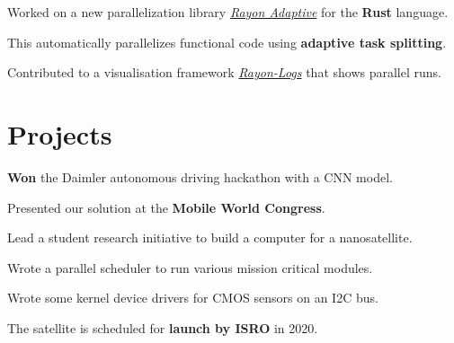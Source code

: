 \documentclass[]{smresume}
\begin{document}
\begin{minipage}[t]{0.66\textwidth}
\begin{tightemize}
\item Worked on a new parallelization library \emph{\href{http://datamove.imag.fr/frederic.wagner/rayon-adaptive.html}{Rayon Adaptive}} for the \textbf{Rust} language.
\item This automatically parallelizes functional code using \textbf{adaptive task splitting}. 
\item Contributed to a visualisation framework \emph{\href{http://datamove.imag.fr/frederic.wagner/rayon-logs.html}{Rayon-Logs}} that shows parallel runs.
\end{tightemize}
\subsectionsep


% 

\section{Projects}
\begin{tightemize}
\item \textbf{Won} the Daimler autonomous driving hackathon with a CNN model. 
\item Presented our solution at the \textbf{Mobile World Congress}.
\end{tightemize}

\begin{tightemize}
    \item Lead a student research initiative to build a computer for a nanosatellite.
    \item Wrote a parallel scheduler to run various mission critical modules.
    \item Wrote some kernel device drivers for CMOS sensors on an I2C bus.
    \item The satellite is scheduled for \textbf{launch by ISRO} in 2020.
\end{tightemize}

\end{minipage}
\end{document}
